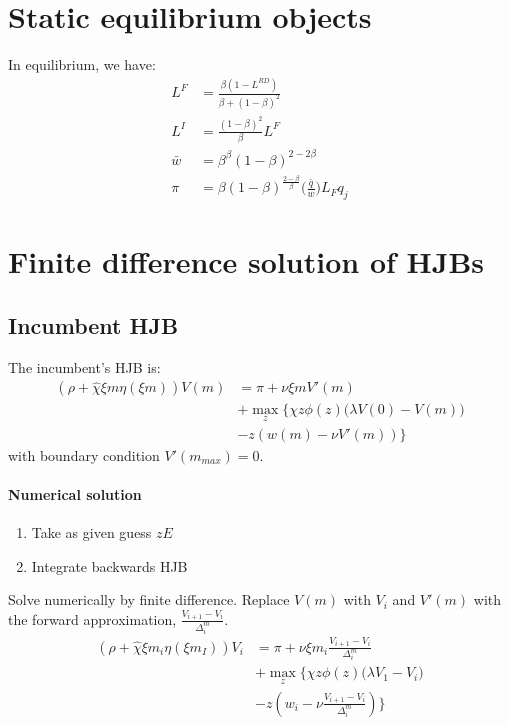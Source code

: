 \documentclass[12pt,english]{article}
\theoremstyle{remark}
\begin{document}
\section{Static equilibrium objects}
In equilibrium, we have:
\begin{align} 
	L^F &= \frac{\beta(1-L^{RD})}{\beta + (1-\beta)^2}\\
	L^I &= \frac{(1-\beta)^2}{\beta} L^F\\
	\bar{w} &= \beta^{\beta} (1-\beta)^{2-2\beta} \\
	\pi &= \beta(1-\beta)^{\frac{2-\beta}{\beta}} \Big(\frac{\bar{q}}{w}\Big) L_F q_j 
\end{align}

\section{Finite difference solution of HJBs}
\subsection{Incumbent HJB}
The incumbent's HJB is:
\begin{align}
	(\rho + \hat{\chi} \xi m \eta(\xi m)) V(m) &= \pi + \nu \xi m V'(m) \nonumber \\
											   &+ \max_z \Big\{ \chi z \phi(z) \Big(\lambda V(0) - V(m)\Big) \nonumber \\ 
											   &- z (w(m) - \nu V'(m)) \Big\}
\end{align}
with boundary condition $V'(m_{max}) = 0$. 

\paragraph{Numerical solution}
\begin{enumerate}
	\item Take as given guess $zE$
	\item Integrate backwards HJB 
\end{enumerate}

Solve numerically by finite difference. Replace $V(m)$ with $V_i$ and $V'(m)$ with the forward approximation, $\frac{V_{i+1}-V_i}{\Delta^m_i}$.
\begin{align}
	(\rho + \hat{\chi} \xi m_i \eta(\xi m_I)) V_i &= \pi + \nu \xi m_i \frac{V_{i+1}-V_i}{\Delta^m_i} \nonumber \\
	&+ \max_z \Big\{ \chi z \phi(z) \Big(\lambda V_1 - V_i\Big) \nonumber \\ 
	&- z (w_i - \nu \frac{V_{i+1}-V_i}{\Delta^m_i}) \Big\}
\end{align}
\end{document}
